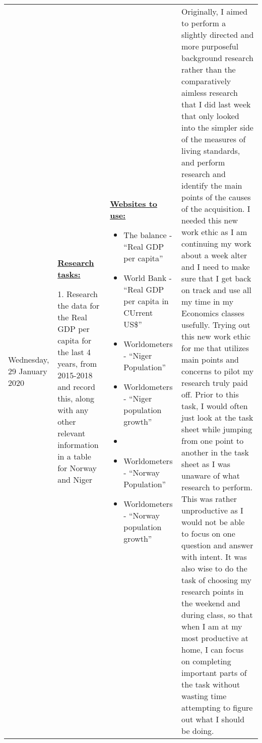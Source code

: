 \documentclass[11pt, a4paper]{article}
\begin{document}
\begin{landscape}
\begin{longtable}{|m{2.5cm}|m{6.6cm}|m{6.6cm}|m{9.41cm}|}
				Wednesday, 29 January 2020

				&
				
				\textbf{\underline{Research tasks:}}
				
				1. Research the data for the Real GDP per capita for the last 4 years, from 2015-2018 and record this, along with any other relevant information in a table for Norway and Niger

			  	& 
		 	
				\textbf{\underline{Websites to use:}}
				\newline
			
				\begin{itemize}
					\item The balance - ``Real GDP per capita''
					\item World Bank - ``Real GDP per capita in CUrrent US\$''
					\item Worldometers - ``Niger Population''
					\item Worldometers - ``Niger population growth''
					\item \item Worldometers - ``Norway Population''
					\item Worldometers - ``Norway population growth''
				\end{itemize}
				
				&
				
				Originally, I aimed to perform a slightly directed and more purposeful background research rather than the comparatively aimless research that I did last week that only looked into the simpler side of the measures of living standards, and perform research and identify the main points of the causes of the acquisition. I needed this new work ethic as I am continuing my work about a week alter and I need to make sure that I get back on track and use all my time in my Economics classes usefully. Trying out this new work ethic for me that utilizes main points and concerns to pilot my research truly paid off. Prior to this task, I would often just look at the task sheet while jumping from one point to another in the task sheet as I was unaware of what research to perform. This was rather unproductive as I would not be able to focus on one question and answer with intent. It was also wise to do the task of choosing my research points in the weekend and during class, so that when I am at my most productive at home, I can focus on completing important parts of the task without wasting time attempting to figure out what I should be doing. 


\end{longtable}
\end{landscape}
\end{document}
